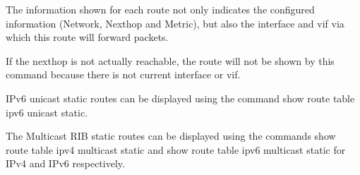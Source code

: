 \vspace{0.1in} 
The information shown for each route not only indicates the configured
information (Network, Nexthop and Metric), but also the interface
and vif via which this route will forward packets.

If the nexthop is not actually reachable, the route will not be shown
by this command because there is not current interface or vif.

\vspace{0.2in}
IPv6 unicast static routes can be displayed using the command {\stt show route
table ipv6 unicast static}.

The Multicast RIB static routes can be displayed using the commands
{\stt show route table ipv4 multicast static} and
{\stt show route table ipv6 multicast static} for IPv4 and IPv6 respectively.

